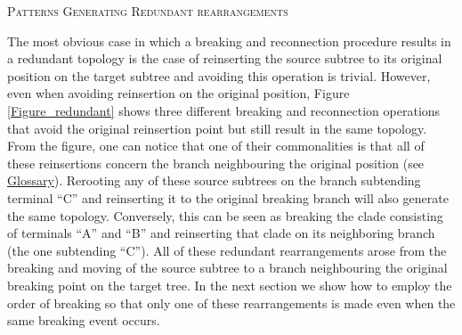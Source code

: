 \documentclass[12pt,letterpaper]{article}
\renewcommand{\section}[1]{%
\bigskip
\begin{center}
\begin{Large}
\normalfont\scshape #1
\medskip
\end{Large}
\end{center}}
\begin{document}
\section{Patterns Generating Redundant rearrangements}
The most obvious case in which a breaking and reconnection procedure results in a redundant topology is the case of reinserting the source subtree to its original position on the target subtree and avoiding this operation is trivial.
However, even when avoiding reinsertion on the original position, Figure \ref{Figure_redundant} shows three different breaking and reconnection operations that avoid the original reinsertion point but still result in the same topology. 
From the figure, one can notice that one of their commonalities is that all of these reinsertions concern the branch neighbouring the original position (see \hyperref[Glossary]{Glossary}).
Rerooting any of these source subtrees on the branch subtending terminal ``C'' and reinserting it to the original breaking branch will also generate the same topology.
Conversely, this can be seen as breaking the clade consisting of terminals ``A'' and ``B'' and reinserting that clade on its neighboring branch (the one subtending ``C'').
All of these redundant rearrangements arose from the breaking and moving of the source subtree to a branch neighbouring the original breaking point on the target tree.
In the next section we show how to employ the order of breaking so that only one of these rearrangements is made even when the same breaking event occurs.
\end{document}
